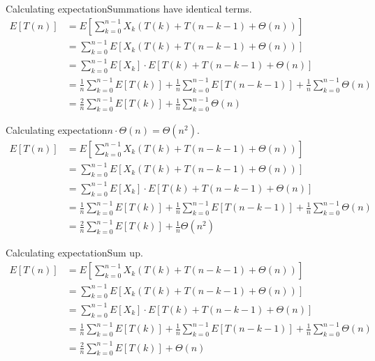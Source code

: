 \documentclass{beamer}
\begin{document}
\begin{frame}{Calculating expectation}{Summations have identical terms.}
    \begin{equation*}
        \begin{split}
E[T(n)] &= E\left[ \sum\limits_{k=0}^{n-1} X_k(T(k) + T(n - k - 1) + \Theta(n)) \right] \\
        &= \sum\limits_{k=0}^{n-1} E\left[ X_k(T(k) + T(n - k - 1) + \Theta(n)) \right] \\
        &= \sum\limits_{k=0}^{n-1} E[X_k] \cdot E[T(k) + T(n - k - 1) + \Theta(n)] \\
        &= \frac{1}{n}\sum\limits_{k=0}^{n-1} E[T(k)] +
           \frac{1}{n}\sum\limits_{k=0}^{n-1} E[T(n - k - 1)] +
           \frac{1}{n}\sum\limits_{k=0}^{n-1} \Theta(n) \\
        &= \frac{2}{n}\sum\limits_{k=0}^{n-1} E[T(k)] + \frac{1}{n}\sum\limits_{k=0}^{n-1} \Theta(n)
        \end{split}
    \end{equation*}
\end{frame}

\begin{frame}{Calculating expectation}{$n\cdot\Theta(n)=\Theta(n^2)$.}
    \begin{equation*}
        \begin{split}
E[T(n)] &= E\left[ \sum\limits_{k=0}^{n-1} X_k(T(k) + T(n - k - 1) + \Theta(n)) \right] \\
        &= \sum\limits_{k=0}^{n-1} E\left[ X_k(T(k) + T(n - k - 1) + \Theta(n)) \right] \\
        &= \sum\limits_{k=0}^{n-1} E[X_k] \cdot E[T(k) + T(n - k - 1) + \Theta(n)] \\
        &= \frac{1}{n}\sum\limits_{k=0}^{n-1} E[T(k)] +
           \frac{1}{n}\sum\limits_{k=0}^{n-1} E[T(n - k - 1)] +
           \frac{1}{n}\sum\limits_{k=0}^{n-1} \Theta(n) \\
        &= \frac{2}{n}\sum\limits_{k=0}^{n-1} E[T(k)] + \frac{1}{n}\Theta(n^2)
        \end{split}
    \end{equation*}
\end{frame}

\begin{frame}{Calculating expectation}{Sum up.}
    \begin{equation*}
        \begin{split}
E[T(n)] &= E\left[ \sum\limits_{k=0}^{n-1} X_k(T(k) + T(n - k - 1) + \Theta(n)) \right] \\
        &= \sum\limits_{k=0}^{n-1} E\left[ X_k(T(k) + T(n - k - 1) + \Theta(n)) \right] \\
        &= \sum\limits_{k=0}^{n-1} E[X_k] \cdot E[T(k) + T(n - k - 1) + \Theta(n)] \\
        &= \frac{1}{n}\sum\limits_{k=0}^{n-1} E[T(k)] +
           \frac{1}{n}\sum\limits_{k=0}^{n-1} E[T(n - k - 1)] +
           \frac{1}{n}\sum\limits_{k=0}^{n-1} \Theta(n) \\
        &= \frac{2}{n}\sum\limits_{k=0}^{n-1} E[T(k)] + \Theta(n)
        \end{split}
    \end{equation*}
\end{frame}
\end{document}
